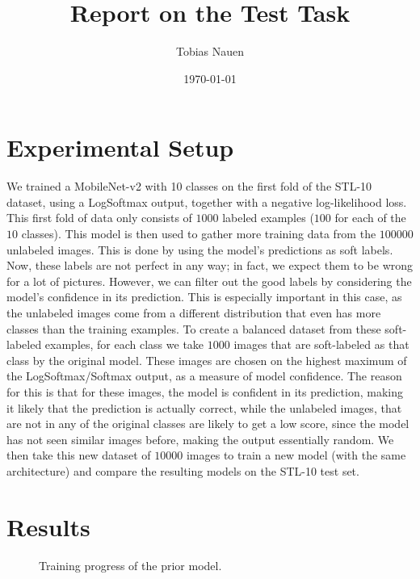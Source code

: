 \documentclass[a4paper,onecolumn,oneside,11pt,english,bibliography=totoc]{article}
\title{Report on the Test Task}
\author{
	Tobias Nauen
}
\date{\today}
\newcommand{\1}{\mathds{1}}
\theoremstyle{breakit}
\theoremstyle{break}
\begin{document}
	\maketitle
	\section*{Experimental Setup}
	We trained a MobileNet-v2 with 10 classes on the first fold of the STL-10 dataset, using a LogSoftmax output, together with a negative log-likelihood loss. This first fold of data only consists of $1000$ labeled examples ($100$ for each of the $10$ classes). This model is then used to gather more training data from the $100 000$ unlabeled images. This is done by using the model's predictions as soft labels. Now, these labels are not perfect in any way; in fact, we expect them to be wrong for a lot of pictures. However, we can filter out the good labels by considering the model's confidence in its prediction. This is especially important in this case, as the unlabeled images come from a different distribution that even has more classes than the training examples. To create a balanced dataset from these soft-labeled examples, for each class we take $1000$ images that are soft-labeled as that class by the original model. These images are chosen on the highest maximum of the LogSoftmax/Softmax output, as a measure of model confidence. The reason for this is that for these images, the model is confident in its prediction, making it likely that the prediction is actually correct, while the unlabeled images, that are not in any of the original classes are likely to get a low score, since the model has not seen similar images before, making the output essentially random. We then take this new dataset of $10000$ images to train a new model (with the same architecture) and compare the resulting models on the STL-10 test set.
	
	\section*{Results}
	\begin{figure}[h]
	    \centering
	    \resizebox{\textwidth}{!}{}
	    \caption{Training progress of the prior model.}
	    \label{fig:training_prior}
	\end{figure}
	
	\begin{table}[h]
	    \centering
	    \caption{Stats of the soft-labeled dataset of $10000$ images.}
	    \label{tab:soft_dataset_stats}
	\end{table}
	
\end{document}
